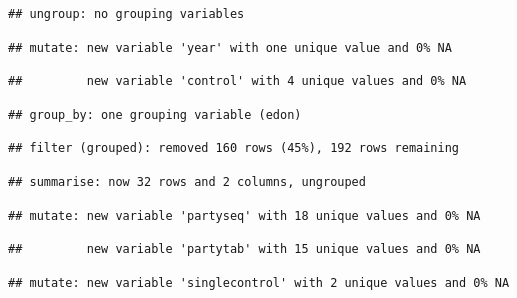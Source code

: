 \documentclass[]{article}
\newenvironment{Shaded}{\begin{snugshade}}{\end{snugshade}}
\newcommand{\DataTypeTok}[1]{\textcolor[rgb]{0.13,0.29,0.53}{#1}}
\newcommand{\DecValTok}[1]{\textcolor[rgb]{0.00,0.00,0.81}{#1}}
\newcommand{\KeywordTok}[1]{\textcolor[rgb]{0.13,0.29,0.53}{\textbf{#1}}}
\newcommand{\NormalTok}[1]{#1}
\newcommand{\OperatorTok}[1]{\textcolor[rgb]{0.81,0.36,0.00}{\textbf{#1}}}
\newcommand{\StringTok}[1]{\textcolor[rgb]{0.31,0.60,0.02}{#1}}
\begin{document}
\begin{verbatim}
## ungroup: no grouping variables
\end{verbatim}

\begin{verbatim}
## mutate: new variable 'year' with one unique value and 0% NA
\end{verbatim}

\begin{verbatim}
##         new variable 'control' with 4 unique values and 0% NA
\end{verbatim}

\begin{Shaded}
\end{Shaded}

\begin{verbatim}
## group_by: one grouping variable (edon)
\end{verbatim}

\begin{verbatim}
## filter (grouped): removed 160 rows (45%), 192 rows remaining
\end{verbatim}

\begin{verbatim}
## summarise: now 32 rows and 2 columns, ungrouped
\end{verbatim}

\begin{verbatim}
## mutate: new variable 'partyseq' with 18 unique values and 0% NA
\end{verbatim}

\begin{verbatim}
##         new variable 'partytab' with 15 unique values and 0% NA
\end{verbatim}

\begin{verbatim}
## mutate: new variable 'singlecontrol' with 2 unique values and 0% NA
\end{verbatim}
\end{document}

